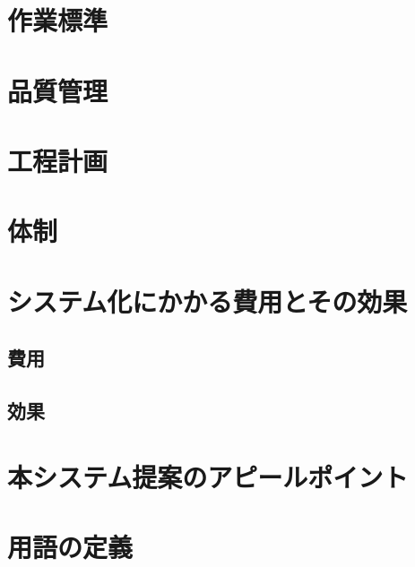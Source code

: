 \documentclass[a4j,titlepage]{ujarticle}
\begin{document}
\section{作業標準}
\section{品質管理}
\section{工程計画}
\section{体制}
\section{システム化にかかる費用とその効果}
\subsection{費用}
\subsection{効果}
\section{本システム提案のアピールポイント}
\section{用語の定義}
\newpage
\end{document}
